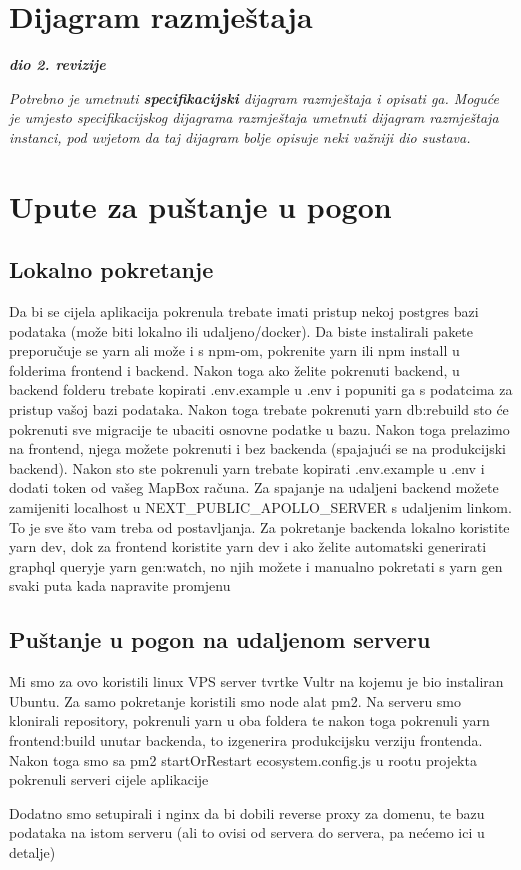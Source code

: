 			
			\eject 
		
		
		\section{Dijagram razmještaja}
			
			\textbf{\textit{dio 2. revizije}}
			
			 \textit{Potrebno je umetnuti \textbf{specifikacijski} dijagram razmještaja i opisati ga. Moguće je umjesto specifikacijskog dijagrama razmještaja umetnuti dijagram razmještaja instanci, pod uvjetom da taj dijagram bolje opisuje neki važniji dio sustava.}
			
			\eject 
		
		\section{Upute za puštanje u pogon}
			\subsection{Lokalno pokretanje}
				Da bi se cijela aplikacija pokrenula trebate imati pristup nekoj postgres bazi 
				podataka (može biti lokalno ili udaljeno/docker). Da biste instalirali pakete 
				preporučuje se yarn ali može i s npm-om, pokrenite yarn ili npm install u folderima 
				frontend i backend. Nakon toga ako želite pokrenuti backend, u backend folderu 
				trebate kopirati .env.example u .env i popuniti ga s podatcima za pristup vašoj 
				bazi podataka. Nakon toga trebate pokrenuti yarn db:rebuild sto će pokrenuti sve 
				migracije te ubaciti osnovne podatke u bazu. 
				Nakon toga prelazimo na frontend, njega možete pokrenuti i bez backenda 
				(spajajući se na produkcijski backend). Nakon sto ste pokrenuli yarn trebate kopirati 
				.env.example u .env i dodati token od vašeg MapBox računa. Za spajanje na udaljeni 
				backend možete zamijeniti localhost u NEXT\_PUBLIC\_APOLLO\_SERVER s udaljenim linkom. 
				To je sve što vam treba od postavljanja.
				Za pokretanje backenda lokalno koristite yarn dev, dok za frontend 
				koristite yarn dev i ako želite automatski generirati graphql queryje yarn gen:watch, 
				no njih možete i manualno pokretati s yarn gen svaki puta kada napravite promjenu
			
			\subsection{Puštanje u pogon na udaljenom serveru}
			Mi smo za ovo koristili linux VPS server tvrtke Vultr na kojemu je bio instaliran Ubuntu. Za samo pokretanje koristili smo node alat pm2. Na serveru smo klonirali repository, pokrenuli yarn u oba foldera te nakon toga pokrenuli yarn frontend:build unutar backenda, to izgenerira produkcijsku verziju frontenda. Nakon toga smo sa pm2 startOrRestart ecosystem.config.js u rootu projekta pokrenuli serveri cijele aplikacije

			Dodatno smo setupirali i nginx da bi dobili reverse proxy za domenu, te bazu podataka na istom serveru (ali to ovisi od servera do servera, pa nećemo ici u detalje)
			
			\eject 